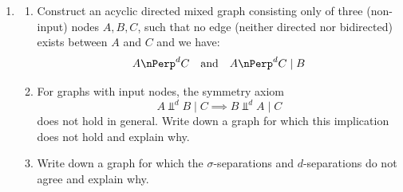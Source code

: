 \begin{enumerate}
    \begin{ungradedsolution}
        \begin{enumerate}
            \item Yes
            \item No, the walk $C\rightarrow D \leftarrow E$ is active because the collider $D$ is in the conditioning set.
            \item No, the walk $B\leftarrow C \to D$ is active as the confounder $C$ is not in the conditioning set.
            \item Yes, the confounder $C$ is in the conditioning set.
        \end{enumerate}
    \end{ungradedsolution}

    \item
    \begin{enumerate}
        \item Construct an acyclic directed mixed graph consisting only of three (non-input) nodes $A,B,C$, such that no edge (neither directed nor bidirected) exists between $A$ and $C$ and we have:
        \[
            A \nPerp^d C \quad\text{and}\quad A \nPerp^d C \mid B
        \]
        \item %
        For graphs with input nodes, the symmetry axiom
        \[
            A \Perp^d B \mid C \implies B \Perp^d A \mid C
        \]
        does not hold in general. Write down a graph for which this implication does not hold and explain why.
        \item  %
        Write down a graph for which the $\sigma$-separations and $d$-separations do not agree and explain why.
    \end{enumerate}


\end{enumerate}

